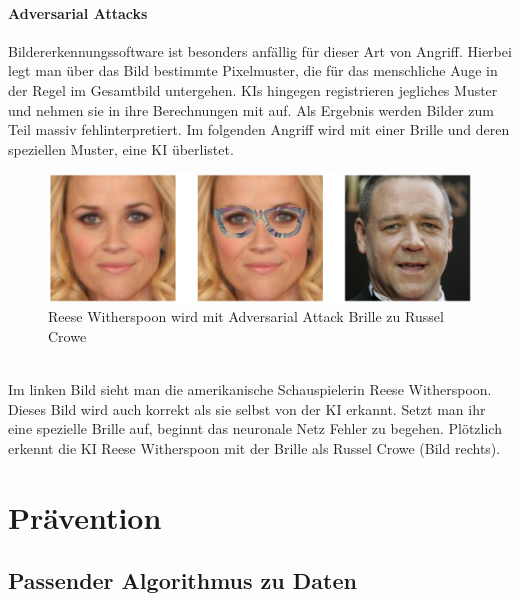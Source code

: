 \documentclass[12pt,oneside,a4paper,parskip]{scrbook}
\begin{document}
\subsubsection{Adversarial Attacks}
Bildererkennungssoftware ist besonders anfällig für dieser Art von Angriff. 
Hierbei legt man über das Bild bestimmte Pixelmuster, die für das menschliche Auge in der Regel im Gesamtbild untergehen. KIs hingegen registrieren jegliches Muster und nehmen sie in ihre Berechnungen mit auf. Als Ergebnis werden Bilder zum Teil massiv fehlinterpretiert.
Im folgenden Angriff wird mit einer Brille und deren speziellen Muster, eine KI überlistet.
\label{section:BrilleAttack}
\begin{figure}[h]
	\begin{center}
		\includegraphics[width=15cm]{Bilder/Brille_Adversarial_Attack.png}
		\caption{Reese Witherspoon wird mit Adversarial Attack Brille zu Russel Crowe}
		\label{fig:BrilleAttack}
	\end{center}
\end{figure}
\\Im linken Bild sieht man die amerikanische Schauspielerin Reese Witherspoon. Dieses Bild wird auch korrekt als sie selbst von der KI erkannt. Setzt man ihr eine spezielle Brille auf, beginnt das neuronale Netz Fehler zu begehen. Plötzlich erkennt die KI Reese Witherspoon mit der Brille als Russel Crowe (Bild rechts).

\chapter{Prävention}
\label{chapter:main}
\section{Passender Algorithmus zu Daten}
\end{document}

